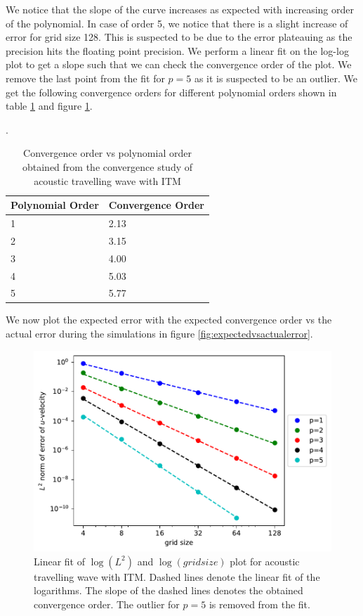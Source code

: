 We notice that the slope of the curve increases as expected with increasing order of the polynomial. In case of order 5, we notice that there is a slight increase
of error for grid size 128. This is suspected to be due to the error plateauing as the precision hits the floating point precision. We perform a linear fit on the log-log
plot to get a slope such that we can check the convergence order of the plot. We remove the last point from the fit for $p=5$ as it is suspected to be an outlier. 
We get the following convergence orders for different polynomial orders shown in table \ref{table:convergenceorder} and figure \ref{fig:convergenceorder}.

\begin{center}
\begin{table}[!htpb]
    \centering
    \caption{Convergence order vs polynomial order obtained from the convergence study of acoustic travelling wave with \ac{ITM}}.
    \label{table:convergenceorder}
    \begin{tabular}{|l|l|}
        \hline
     \textbf{Polynomial Order}& \textbf{Convergence Order}  \\
     \hline
     1 & 2.13\\
     \hline
     2 & 3.15 \\
     \hline
     3 & 4.00 \\
     \hline
     4 & 5.03 \\
        \hline
        5 & 5.77\\
        \hline
    \end{tabular}
    \end{table}
\end{center}
We now plot the expected error with the expected convergence order vs the actual error during the simulations in figure \ref{fig:expectedvsactualerror}.
\begin{figure}[!htpb]
    \centering
    \includegraphics[width=0.75\linewidth]{figures/error2.pdf}
    \caption{Linear fit of $\log\left(L^2\right)$ and $\log\left(grid size\right)$  plot for acoustic travelling wave with \ac{ITM}. Dashed lines denote the linear fit of the logarithms. The slope of the dashed lines denotes the obtained convergence order. The outlier for $p=5$ is removed from the fit.}
    \label{fig:convergenceorder}
\end{figure}
